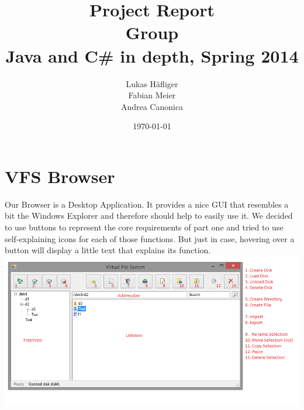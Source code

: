 \documentclass[a4paper,12pt]{article}
\title{
Project Report \\ 
Group \groupname \\
\vspace{5mm}
\large Java and C\# in depth, Spring 2014
}
\author{
Lukas Häfliger\\
Fabian Meier\\
Andrea Canonica
}
\date{\today}
\newcommand{\groupname}{What was it?\xspace}
\begin{document}
\maketitle




\section{VFS Browser}

Our Browser is a Desktop Application. It provides a nice GUI that resembles a bit the Windows Explorer and therefore should help to easily use it. We decided to use buttons to represent the core requirements of part one and tried to use self-explaining icons for each of those functions. But just in case, 
hovering over a button will display a little text that explains its function. \\

\includegraphics[scale=0.6] {report2_GUI}
\end{document}
